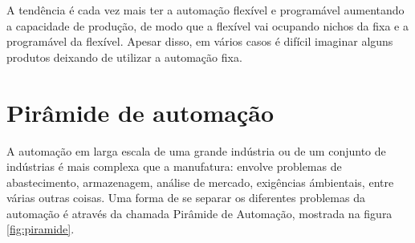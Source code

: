 A tendência é cada vez mais ter a automação flexível e programável aumentando a capacidade de produção, de modo que a flexível vai ocupando nichos da fixa e a programável da flexível. Apesar disso, em vários casos é difícil imaginar alguns produtos deixando de utilizar a automação fixa.

\section{Pirâmide de automação}

A automação em larga escala de uma grande indústria ou de um conjunto de indústrias é mais complexa que a manufatura: envolve problemas de abastecimento, armazenagem, análise de mercado, exigências ámbientais, entre várias outras coisas. Uma forma de se separar os diferentes problemas da automação é através da chamada Pirâmide de Automação, mostrada na figura \ref{fig:piramide}.

